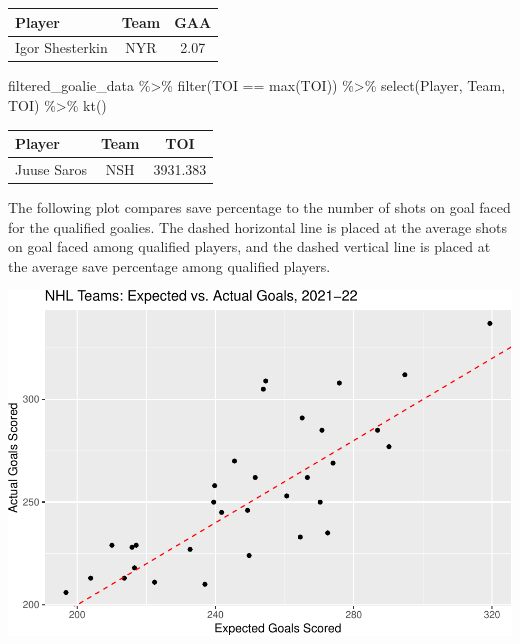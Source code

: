 \documentclass[
  11pt,
]{book}
\newenvironment{Shaded}{\begin{snugshade}}{\end{snugshade}}
\newcommand{\FunctionTok}[1]{\textcolor[rgb]{0.00,0.00,0.00}{#1}}
\newcommand{\NormalTok}[1]{#1}
\newcommand{\SpecialCharTok}[1]{\textcolor[rgb]{0.00,0.00,0.00}{#1}}
\theoremstyle{definition}
\theoremstyle{definition}
\theoremstyle{definition}
\theoremstyle{definition}
\theoremstyle{remark}
\begin{document}
\begin{table}[H]
\centering
\begin{tabular}{l|c|c}
\hline
Player & Team & GAA\\
\hline
Igor Shesterkin & NYR & 2.07\\
\hline
\end{tabular}
\end{table}

\begin{Shaded}
\begin{Highlighting}[]
\NormalTok{filtered\_goalie\_data }\SpecialCharTok{\%\textgreater{}\%}
    \FunctionTok{filter}\NormalTok{(TOI }\SpecialCharTok{==} \FunctionTok{max}\NormalTok{(TOI)) }\SpecialCharTok{\%\textgreater{}\%}
    \FunctionTok{select}\NormalTok{(Player, Team, TOI) }\SpecialCharTok{\%\textgreater{}\%}
    \FunctionTok{kt}\NormalTok{()}
\end{Highlighting}
\end{Shaded}

\begin{table}[H]
\centering
\begin{tabular}{l|c|c}
\hline
Player & Team & TOI\\
\hline
Juuse Saros & NSH & 3931.383\\
\hline
\end{tabular}
\end{table}

The following plot compares save percentage to the number of shots on goal faced for the qualified goalies. The dashed horizontal line is placed at the average shots on goal faced among qualified players, and the dashed vertical line is placed at the average save percentage among qualified players.

\includegraphics{series_files/figure-latex/unnamed-chunk-28-1.pdf}
\end{document}
